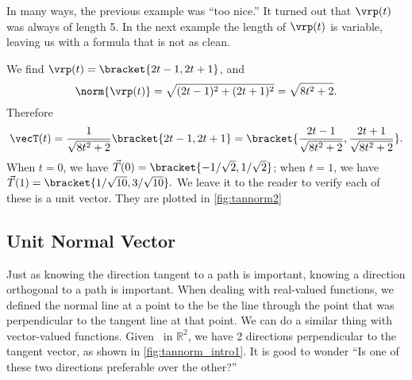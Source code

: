 
In many ways, the previous example was ``too nice.'' It turned out that $\vrp(t)$ was always of length 5. In the next example the length of $\vrp(t)$ is variable, leaving us with a formula that is not as clean.

{We find $\vrp(t) =\bracket{2t-1,2t+1}$, and
%
%
\[\norm{\vrp(t)} = \sqrt{(2t-1)^2+(2t+1)^2} = \sqrt{8t^2+2}.\]
Therefore
\[\vecT(t) = \frac{1}{\sqrt{8t^2+2}}\bracket{2t-1,2t+1}=\bracket{\frac{2t-1}{\sqrt{8t^2+2}},\frac{2t+1}{\sqrt{8t^2+2}}}.\]
When $t=0$, we have $\vec T(0) =\bracket{-1/\sqrt{2},1/\sqrt{2}}$; when $t=1$, we have $\vec T(1) =\bracket{1/\sqrt{10}, 3/\sqrt{10}}.$ We leave it to the reader to verify each of these is a unit vector. They are plotted in \autoref{fig:tannorm2}}

\subsection{Unit Normal Vector}

Just as knowing the direction tangent to a path is important, knowing a direction orthogonal to a path is important. When dealing with real-valued functions, we defined the normal line at a point to the be the line through the point that was perpendicular to the tangent line at that point. We can do a similar thing with vector-valued functions. Given \vrt\ in $\mathbb{R}^2$, we have 2 directions perpendicular to the tangent vector, as shown in \autoref{fig:tannorm_intro1}. It is good to wonder ``Is one of these two directions preferable over the other?''

